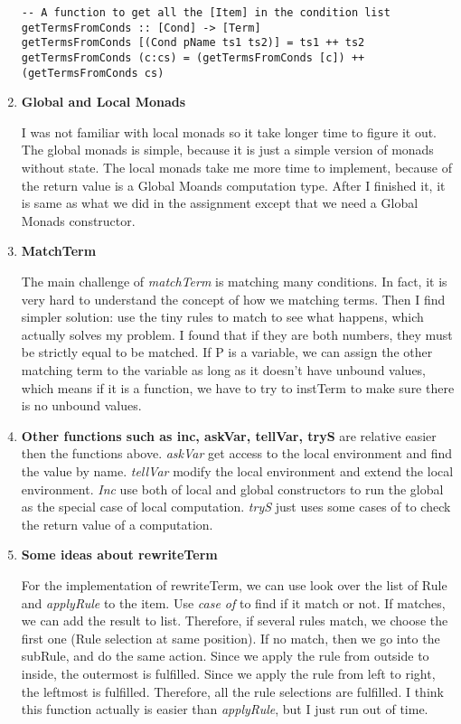 \documentclass[11pt]{article}
\begin{document}
\begin{enumerate}
\begin{lstlisting}
-- A function to get all the [Item] in the condition list
getTermsFromConds :: [Cond] -> [Term]
getTermsFromConds [(Cond pName ts1 ts2)] = ts1 ++ ts2
getTermsFromConds (c:cs) = (getTermsFromConds [c]) ++ (getTermsFromConds cs)
\end{lstlisting}

\item \textbf{Global and Local Monads}

I was not familiar with local monads so it take longer time to figure it out. The global monads is simple, because it is just a simple version of monads without state. The local monads take me more time to implement, because of the return value is a Global Moands computation type. After I finished it, it is same as what we did in the assignment except that we need a Global Monads constructor. 

\item \textbf{MatchTerm}

The main challenge of \textit{matchTerm} is matching many conditions. In fact, it is very hard to understand the concept of how we matching terms. Then I find simpler solution: use the tiny rules to match to see what happens, which actually solves my problem. I found that if they are both numbers, they must be strictly equal to be matched. If P is a variable, we can assign the other matching term to the variable as long as it doesn't have unbound values, which means if it is a function, we have to try to instTerm to make sure there is no unbound values.  

\item \textbf{Other functions such as inc, askVar, tellVar, tryS} are relative easier then the functions above. \textit{askVar} get access to the local environment and find the value by name. \textit{tellVar} modify the local environment and extend the local environment. \textit{Inc} use both of local and global constructors to run the global as the special case of local computation. \textit{tryS} just uses some cases of to check the return value of a computation. 

\item \textbf{Some ideas about rewriteTerm}

For the implementation of rewriteTerm, we can use look over the list of Rule and \textit{applyRule} to the item. Use \textit{case of} to find if it match or not.  If matches, we can add the result to list. Therefore, if  several rules match, we choose the first one (Rule selection at same position). If no match, then we go into the subRule, and do the same action. Since we apply the rule from outside to inside, the outermost is fulfilled. Since we apply the rule from left to right, the leftmost is fulfilled. Therefore, all the rule selections are fulfilled. I think this function actually is easier than \textit{applyRule}, but I just run out of time. 


\end{enumerate}
\end{document}
